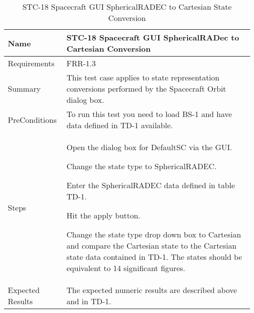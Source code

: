 \begin{table}[htbp!]
\centering
      \begin{tabular}{|p{1.05 in} |p{4.75 in} |}
      \hline
         \rowcolor[rgb]{0.8,0.8,0.8} Name & STC-18 Spacecraft GUI SphericalRADec to Cartesian Conversion\\
         \hline
         Requirements & FRR-1.3\\ \hline
         Summary &
         This test case applies to state representation conversions performed by the Spacecraft Orbit dialog box.  \\
         \hline
         PreConditions & To run this test you need to load BS-1 and have data defined in TD-1 available.\\
         \hline
         Steps &
         \begin{compactenum}
         \item Open the dialog box for DefaultSC via the GUI.
         \item Change the state type to SphericalRADEC.
         \item Enter the SphericalRADEC data defined in table TD-1.
         \item Hit the apply button.
         \item Change the state type drop down box to Cartesian and compare the Cartesian state to the
         Cartesian state data contained in TD-1. The states should be equivalent to 14 significant figures.
         \end{compactenum}\\
         \hline
         Expected Results & The expected numeric results are described above and in TD-1.\\
      \hline
\end{tabular}
      \label{Table: STC-18}
      \caption{STC-18 Spacecraft GUI SphericalRADEC to Cartesian State Conversion}
\end{table} 